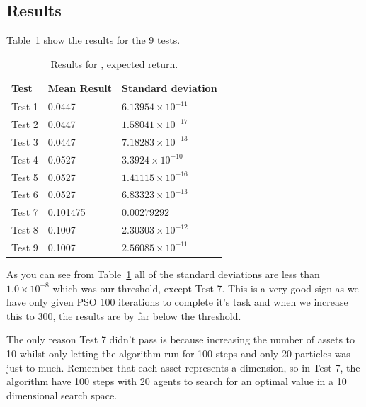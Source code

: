 \documentclass{pdfmx4020}
\begin{document}
    \subsection{Results} %
    \label{sub:results}
      Table~\ref{table:expected_results} show the results for the 9 tests.
        \begin{table}[H]
          \setlength{\extrarowheight}{2.0pt}
          \begin{tabular}{|l|l|l|}
            \hline
            Test & Mean Result & Standard deviation \\
            \hline
            Test 1 & 0.0447 & $6.13954\times10^{-11}$ \\
            \hline
            Test 2 & 0.0447 & $1.58041\times10^{-17}$ \\
            \hline
            Test 3 & 0.0447 & $7.18283\times10^{-13}$ \\
            \hline
            Test 4 & 0.0527 & $3.3924\times10^{-10}$ \\
            \hline
            Test 5 & 0.0527 & $1.41115\times10^{-16}$ \\
            \hline
            Test 6 & 0.0527 & $6.83323\times10^{-13}$ \\
            \hline
            Test 7 & 0.101475 & $0.00279292$ \\
            \hline
            Test 8 & 0.1007 & $2.30303\times10^{-12}$ \\
            \hline
            Test 9 & 0.1007 & $2.56085\times10^{-11}$ \\
            \hline
          \end{tabular}
          \caption{Results for , expected return.}
          \label{table:expected_results}
        \end{table}
      As you can see from Table~\ref{table:expected_results} all of the standard deviations are less than $1.0\times10^{-8}$ which was our threshold, except Test 7. This is a very good sign as we have only given PSO 100 iterations to complete it's task and when we increase this to 300, the results are by far below the threshold. 

      The only reason Test 7 didn't pass is because increasing the number of assets to 10 whilst only letting the algorithm run for 100 steps and only 20 particles was just to much. Remember that each asset represents a dimension, so in Test 7, the algorithm have 100 steps with 20 agents to search for an optimal value in a 10 dimensional search space.
\end{document}
